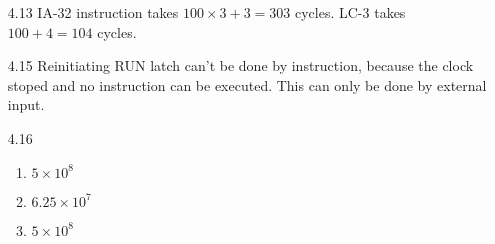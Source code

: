 \documentclass[a4paper]{article}
\begin{document}
\begin{enumerate}
\item[4.13] IA-32 instruction takes $100\times 3 + 3 = 303$
  cycles. LC-3 takes $100 + 4 = 104$ cycles.

\item[4.15] Reinitiating RUN latch can't be done by instruction,
  because the clock stoped and no instruction can be executed. This
  can only be done by external input.

\item[4.16]
  \begin{enumerate}
  \item $5\times 10^{8}$
  \item $6.25\times 10^{7}$
  \item $5\times 10^{8}$
  \end{enumerate}

\end{enumerate}
\end{document}
